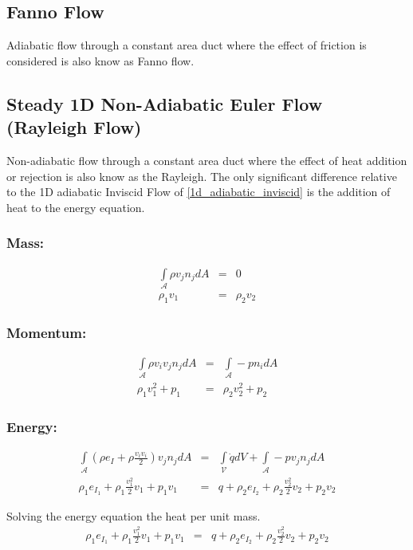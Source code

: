 \newpage
\subsection{Fanno Flow}
Adiabatic flow through a constant area duct where the effect of friction is considered is also know as Fanno flow.

\newpage
\subsection{Steady 1D Non-Adiabatic Euler Flow (Rayleigh Flow)}
Non-adiabatic flow through a constant area duct where the effect of heat addition or rejection is also know as the
Rayleigh. The only significant difference relative to the 1D adiabatic Inviscid Flow of \ref{1d_adiabatic_inviscid} is the addition of heat to the energy equation.
\subsubsection*{Mass:}
 \begin{eqnarray}
    \int\limits_{\mathcal{A}} \rho v_j n_j dA &=& 0 \\
    \rho_1 v_1  &=&\rho_2 v_2
\end{eqnarray}


\subsubsection*{Momentum:}
\begin{eqnarray}
    \int\limits_{\mathcal{A}} \rho v_i v_j n_j dA &=& \int\limits_{\mathcal{A}} - p n_i dA \\
    \rho_1 v^2_1 + p_1&=&  \rho_2 v^2_2 + p_2
\end{eqnarray}

\subsubsection*{Energy:}
\begin{eqnarray}
     \int\limits_{\mathcal{A}} (\rho e_I + \rho\frac{v_i v_i}{2}) v_j n_j dA &=&  \int\limits_{\mathcal{V}} \dot{q} dV + \int\limits_{\mathcal{A}} - p v_j n_j dA \\
     \rho_1 e_{I_1} + \rho_1\frac{v^2_1 }{2} v_1  + p_1 v_1 &=& q + \rho_2 e_{I_2} + \rho_2\frac{v^2_2 }{2} v_2 +  p_2 v_2
\end{eqnarray}

Solving the energy equation the heat per unit mass.
\begin{eqnarray}
     \rho_1 e_{I_1} + \rho_1\frac{v^2_1 }{2} v_1  + p_1 v_1 &=& q + \rho_2 e_{I_2} + \rho_2\frac{v^2_2 }{2} v_2 +  p_2 v_2
\end{eqnarray}





